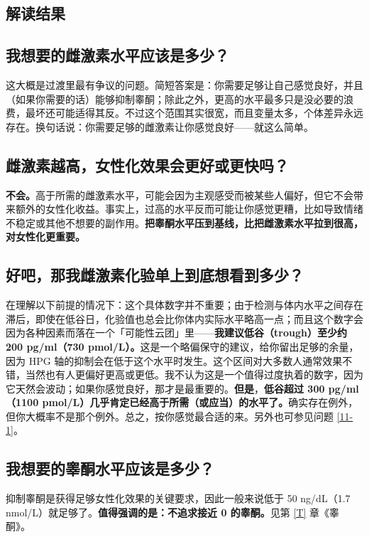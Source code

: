 \documentclass{article}
\begin{document}
\subsection*{解读结果}

\subsection{我想要的雌激素水平应该是多少？}

这大概是过渡里最有争议的问题。简短答案是：你需要足够让自己感觉良好，并且（如果你需要的话）能够抑制睾酮；除此之外，更高的水平最多只是没必要的浪费，最坏还可能适得其反。不过这个范围其实很宽，而且变量太多，个体差异永远存在。换句话说：你需要足够的雌激素让你感觉良好——就这么简单。

\subsection{雌激素越高，女性化效果会更好或更快吗？}

\textbf{不会。}高于所需的雌激素水平，可能会因为主观感受而被某些人偏好，但它不会带来额外的女性化收益。事实上，过高的水平反而可能让你感觉更糟，比如导致情绪不稳定或其他不想要的副作用。\textbf{把睾酮水平压到基线，比把雌激素水平拉到很高，对女性化更重要。}

\subsection{好吧，那我雌激素化验单上到底想看到多少？}

在理解以下前提的情况下：这个具体数字并不重要；由于检测与体内水平之间存在滞后，即使在低谷日，化验值也总会比你体内实际水平略高一点；而且这个数字会因为各种因素而落在一个「可能性云团」里——\textbf{我建议低谷（trough）至少约 200 pg/ml（730 pmol/L）。}这是一个略偏保守的建议，给你留出足够的余量，因为 HPG 轴的抑制会在低于这个水平时发生。这个区间对大多数人通常效果不错，当然也有人更偏好更高或更低。我不认为这是一个值得过度执着的数字，因为它天然会波动；如果你感觉良好，那才是最重要的。\textbf{但是}，\textbf{低谷超过 300 pg/ml（1100 pmol/L）几乎肯定已经高于所需（或应当）的水平了。}确实存在例外，但你大概率不是那个例外。总之，按你感觉最合适的来。另外也可参见问题 \ref{11-1}。

\subsection{我想要的睾酮水平应该是多少？}

抑制睾酮是获得足够女性化效果的关键要求，因此一般来说低于 50 ng/dL（1.7 nmol/L）就足够了。\textbf{值得强调的是：不追求接近 0 的睾酮。}见第 \ref{T} 章《睾酮》。
\end{document}
